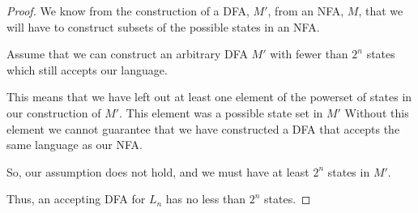 \documentclass[12pt,letterpaper]{article}
\begin{document}
\begin{enumerate}
      \begin{proof}
        We know from the construction of a DFA, $M'$, from an NFA, $M$, that we will have to construct subsets of the possible states in an NFA.

        Assume that we can construct an arbitrary DFA $M'$ with fewer than $2^n$ states which still accepts our language.

        This means that we have left out at least one element of the powerset of states in our construction of $M'$.
        This element was a possible state set in $M'$
        Without this element we cannot guarantee that we have constructed a DFA that accepts the same language as our NFA.

        So, our assumption does not hold, and we must have at least $2^n$ states in $M'$.

        Thus, an accepting DFA for $L_n$ has no less than $2^n$ states.
      \end{proof}
  \end{enumerate}
\end{document}
